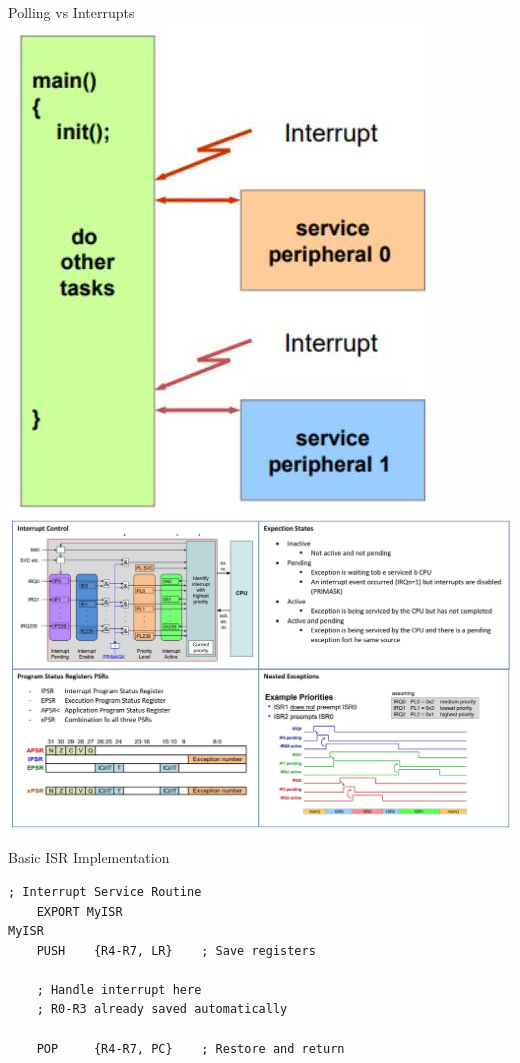 \begin{concept}{Polling vs Interrupts}
\includegraphics[width=\linewidth]{images/2024_12_29_79e6b22f503fb7b4f718g-11(2)}
\includegraphics[width=\linewidth]{images/2024_12_29_79e6b22f503fb7b4f718g-12}
\end{concept}

\begin{example2}{Basic ISR Implementation}
\begin{lstlisting}[language=armasm, style=basesmol]
    ; Interrupt Service Routine
    EXPORT MyISR
MyISR
    PUSH    {R4-R7, LR}    ; Save registers
    
    ; Handle interrupt here
    ; R0-R3 already saved automatically
    
    POP     {R4-R7, PC}    ; Restore and return
\end{lstlisting}
\end{example2}

